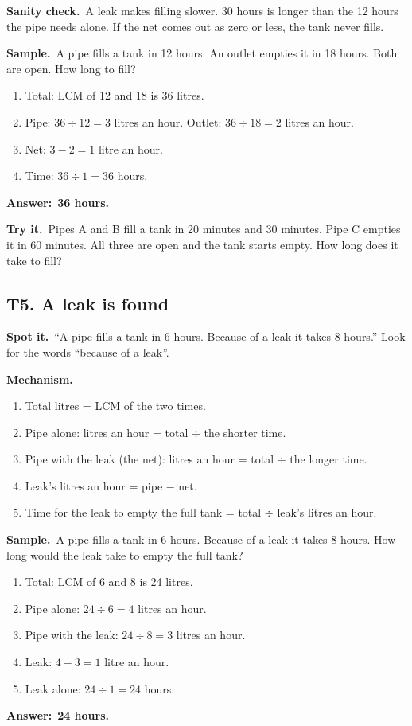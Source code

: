 \documentclass[11pt,a4paper]{article}
\let\oldsubsection\subsection
\renewcommand{\subsection}{\needspace{9\baselineskip}\oldsubsection}
\newcommand{\spot}{\textbf{\color{ember}Spot it.}\ }
\newcommand{\mech}{\textbf{\color{ember}Mechanism.}\ }
\newif\ifkeepsamp
\newcommand{\ans}[1]{\par\nopagebreak\noindent\textbf{\color{ember}Answer:}\ \textbf{#1}\par}
\newcommand{\samp}{\ifkeepsamp\needspace{4\baselineskip}\fi\textbf{\color{ember}Sample.}\ }
\newcommand{\sane}{\textbf{\color{slate}Sanity check.}\ }
\newcommand{\tryit}[1]{\textbf{\color{ember}Try it.}\ #1}
\begin{document}
\sane A leak makes filling slower. 30 hours is longer than the 12 hours the pipe needs alone. If the net comes out as zero or less, the tank never fills.

\samp A pipe fills a tank in 12 hours. An outlet empties it in 18 hours. Both are open. How long to fill?
\begin{enumerate}
\item Total: LCM of 12 and 18 is 36 litres.
\item Pipe: $36 \div 12 = 3$ litres an hour. Outlet: $36 \div 18 = 2$ litres an hour.
\item Net: $3 - 2 = 1$ litre an hour.
\item Time: $36 \div 1 = 36$ hours.
\end{enumerate}
\ans{36 hours.}

\tryit Pipes A and B fill a tank in 20 minutes and 30 minutes. Pipe C empties it in 60 minutes. All three are open and the tank starts empty. How long does it take to fill?

\subsection{T5. A leak is found}
\spot ``A pipe fills a tank in 6 hours. Because of a leak it takes 8 hours.'' Look for the words ``because of a leak''.

\mech
\begin{enumerate}
\item Total litres = LCM of the two times.
\item Pipe alone: litres an hour = total $\div$ the shorter time.
\item Pipe with the leak (the net): litres an hour = total $\div$ the longer time.
\item Leak's litres an hour = pipe $-$ net.
\item Time for the leak to empty the full tank = total $\div$ leak's litres an hour.
\end{enumerate}

\samp A pipe fills a tank in 6 hours. Because of a leak it takes 8 hours. How long would the leak take to empty the full tank?
\begin{enumerate}
\item Total: LCM of 6 and 8 is 24 litres.
\item Pipe alone: $24 \div 6 = 4$ litres an hour.
\item Pipe with the leak: $24 \div 8 = 3$ litres an hour.
\item Leak: $4 - 3 = 1$ litre an hour.
\item Leak alone: $24 \div 1 = 24$ hours.
\end{enumerate}
\ans{24 hours.}
\end{document}
